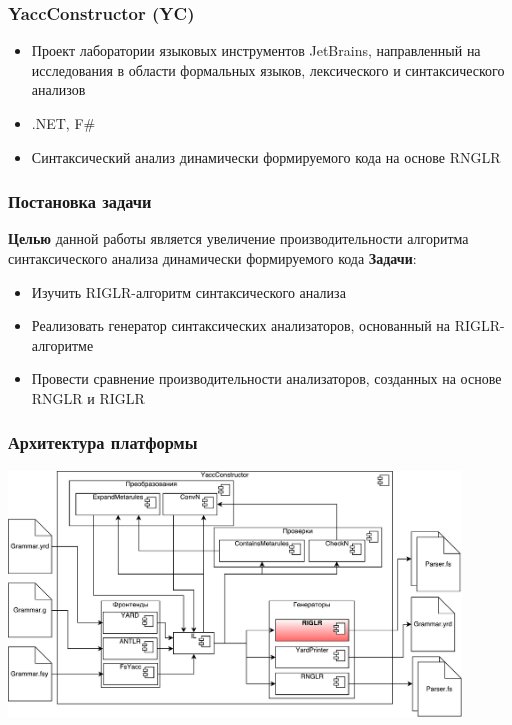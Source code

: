 \documentclass{beamer}
\begin{document}
\begin{frame}
	\transwipe[direction=90]
	\frametitle{YaccConstructor (YC)}
	\begin{itemize}
		\item Проект лаборатории языковых инструментов  JetBrains, направленный на исследования в области формальных языков, лексического и синтаксического анализов
		\item .NET, F$\#$
		\item Синтаксический анализ динамически формируемого кода на основе RNGLR
	\end{itemize}
\end{frame}

\begin{frame}
  \transwipe[direction=90]
  \frametitle{Постановка задачи}
  \textbf{Целью} данной работы является увеличение производительности алгоритма синтаксического анализа динамически формируемого кода
  \textbf{Задачи}:
  \begin{itemize}
    \item Изучить RIGLR-алгоритм синтаксического анализа
    \item Реализовать генератор синтаксических анализаторов, основанный на RIGLR-алгоритме
    \item Провести сравнение производительности анализаторов, созданных на основе RNGLR и RIGLR    
  \end{itemize}
\end{frame}

\begin{frame}[fragile]
	\transwipe[direction=90]
	\frametitle{Архитектура платформы}
	\includegraphics[width=12cm]{pictures/YCArch.pdf}
\end{frame}
\end{document}
